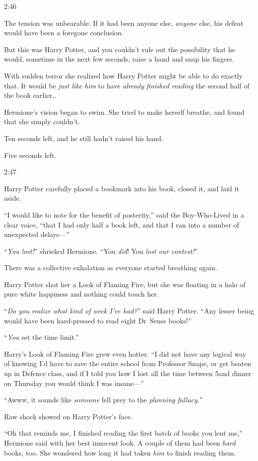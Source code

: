 2:46\pm

The tension was unbearable. If it had been anyone else, \emph{anyone} else, his defeat would have been a foregone conclusion.

But this was Harry Potter, and you couldn’t rule out the possibility that he would, sometime in the next few seconds, raise a hand and snap his fingers.

With sudden terror she realized how Harry Potter might be able to do exactly that. It would be \emph{just like him} to have \emph{already finished reading} the second half of the book earlier…

Hermione’s vision began to swim. She tried to make herself breathe, and found that she simply couldn’t.

Ten seconds left, and he still hadn’t raised his hand.

Five seconds left.

2:47\pm

Harry Potter carefully placed a bookmark into his book, closed it, and laid it aside.

“I would like to note for the benefit of posterity,” said the Boy-Who-Lived in a clear voice, “that I had only half a book left, and that I ran into a number of unexpected delays—”

“\emph{You lost!}” shrieked Hermione. “You \emph{did}! You \emph{lost our contest!}”

There was a collective exhalation as everyone started breathing again.

Harry Potter shot her a Look of Flaming Fire, but she was floating in a halo of pure white happiness and nothing could touch her.

“\emph{Do you realize what kind of week I’ve had?}” said Harry Potter. “Any lesser being would have been hard-pressed to read eight Dr~Seuss books!”

“\emph{You} set the time limit.”

Harry’s Look of Flaming Fire grew even hotter. “I did not have any logical way of knowing I’d have to save the entire school from Professor Snape, or get beaten up in Defence class, and if I told you how I lost all the time between 5\pm and dinner on Thursday you would think I was insane—”

“Awww, it sounds like \emph{someone} fell prey to the \emph{planning fallacy.}”

Raw shock showed on Harry Potter’s face.

“Oh that reminds me, I finished reading the first batch of books you lent me,” Hermione said with her best innocent look. A couple of them had been \emph{hard} books, too. She wondered how long it had taken \emph{him} to finish reading them.

